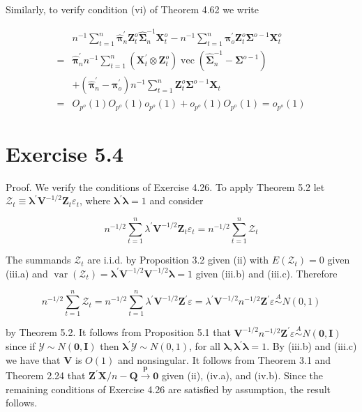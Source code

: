 \documentclass[10pt]{article}
\begin{document}
Similarly, to verify condition (vi) of Theorem 4.62 we write

$$
\begin{aligned}
& n^{-1} \sum_{t=1}^{n} \hat{\boldsymbol{\pi}}_{n}^{\prime} \mathbf{Z}_{t}^{o} \hat{\mathbf{\Sigma}}_{n}^{-1} \mathbf{X}_{t}^{o}-n^{-1} \sum_{t=1}^{n} \boldsymbol{\pi}_{o}^{\prime} \mathbf{Z}_{t}^{o} \boldsymbol{\Sigma}^{o-1} \mathbf{X}_{t}^{o} \\
= & \hat{\boldsymbol{\pi}}_{n}^{\prime} n^{-1} \sum_{t=1}^{n}\left(\mathbf{X}_{t}^{\prime} \otimes \mathbf{Z}_{t}^{o}\right) \operatorname{vec}\left(\hat{\boldsymbol{\Sigma}}_{n}^{-1}-\boldsymbol{\Sigma}^{o-1}\right) \\
& +\left(\hat{\boldsymbol{\pi}}_{n}^{\prime}-\boldsymbol{\pi}_{o}^{\prime}\right) n^{-1} \sum_{t=1}^{n} \mathbf{Z}_{t}^{o} \boldsymbol{\Sigma}^{o-1} \mathbf{X}_{t} \\
= & O_{p^{o}}(1) O_{p^{o}}(1) o_{p^{o}}(1)+o_{p^{o}}(1) O_{p^{o}}(1)=o_{p^{o}}(1)
\end{aligned}
$$

\section*{Exercise 5.4}
Proof. We verify the conditions of Exercise 4.26. To apply Theorem 5.2 let $\mathcal{Z}_{t} \equiv \boldsymbol{\lambda}^{\prime} \mathbf{V}^{-1 / 2} \mathbf{Z}_{t} \varepsilon_{t}$, where $\boldsymbol{\lambda}^{\prime} \boldsymbol{\lambda}=1$ and consider

$$
n^{-1 / 2} \sum_{t=1}^{n} \lambda^{\prime} \mathbf{V}^{-1 / 2} \mathbf{Z}_{t} \varepsilon_{t}=n^{-1 / 2} \sum_{t=1}^{n} \mathcal{Z}_{t}
$$

The summands $\mathcal{Z}_{t}$ are i.i.d. by Proposition 3.2 given (ii) with $E\left(\mathcal{Z}_{t}\right)=0$ given (iii.a) and $\operatorname{var}\left(\mathcal{Z}_{t}\right)=\boldsymbol{\lambda}^{\prime} \mathbf{V}^{-1 / 2} \mathbf{V}^{-1 / 2} \boldsymbol{\lambda}=1$ given (iii.b) and (iii.c). Therefore

$$
n^{-1 / 2} \sum_{t=1}^{n} \mathcal{Z}_{t}=n^{-1 / 2} \sum_{t=1}^{n} \lambda^{\prime} \mathbf{V}^{-1 / 2} \mathbf{Z}^{\prime} \varepsilon=\lambda^{\prime} \mathbf{V}^{-1 / 2} n^{-1 / 2} \mathbf{Z}^{\prime} \varepsilon \stackrel{A}{\sim} N(0,1)
$$

by Theorem 5.2. It follows from Proposition 5.1 that $\mathbf{V}^{-1 / 2} n^{-1 / 2} \mathbf{Z}^{\prime} \varepsilon \stackrel{A}{\sim} N(\mathbf{0}, \mathbf{I})$ since if $\mathcal{Y} \sim N(\mathbf{0}, \mathbf{I})$ then $\boldsymbol{\lambda}^{\prime} \mathcal{Y} \sim N(0,1)$, for all $\boldsymbol{\lambda}, \boldsymbol{\lambda}^{\prime} \boldsymbol{\lambda}=1$. By (iii.b) and (iii.c) we have that $\mathbf{V}$ is $O(1)$ and nonsingular. It follows from Theorem 3.1 and Theorem 2.24 that $\mathbf{Z}^{\prime} \mathbf{X} / n-\mathbf{Q} \xrightarrow{\boldsymbol{p}} \mathbf{0}$ given (ii), (iv.a), and (iv.b). Since the remaining conditions of Exercise 4.26 are satisfied by assumption, the result follows.
\end{document}

